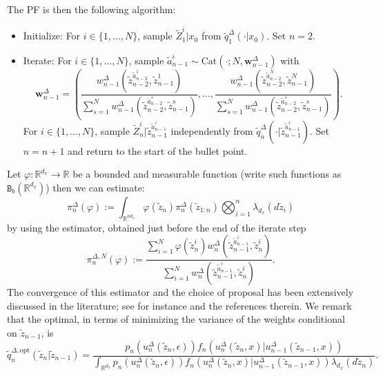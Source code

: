 \documentclass[english,13pt]{article}
\numberwithin{equation}{section}
\begin{document}
The PF is then the following algorithm:
\begin{itemize}
\item{Initialize: For $i\in\{1,\dots,N\}$,  sample $\widetilde{Z}_1^i|x_0$ from $\widetilde{q}_1^{\Delta}(\cdot|x_0)$. Set $n=2$.}
\item{Iterate: For $i\in\{1,\dots,N\}$,  sample $\widetilde{a}_{n-1}^i\sim\text{Cat}(\cdot;N,\mathbf{w}^{\Delta}_{n-1})$ with 
$$\mathbf{w}^{\Delta}_{n-1}=\left( \frac{w_{n-1}^{\Delta}(\widetilde{z}_{n-2}^{\widetilde{a}_{n-2}^1},\widetilde{z}_{n-1}^{1})}
{\sum_{s=1}^N w_{n-1}^{\Delta}(\widetilde{z}_{n-2}^{\widetilde{a}_{n-2}^s},\widetilde{z}_{n-1}^s)},\ldots,\frac{w_{n-1}^{\Delta}(\widetilde{z}_{n-2}^{\widetilde{a}_{n-2}^N},\widetilde{z}_{n-1}^{N})}
{\sum_{s=1}^N w_{n-1}^{\Delta}(\widetilde{z}_{n-2}^{\widetilde{a}_{n-2}^s},\widetilde{z}_{n-1}^s)} \right).$$
For $i\in\{1,\dots,N\}$,  sample $\widetilde{Z}_n^i|\widetilde{z}_{n-1}^{\widetilde{a}_{n-1}^i}$ independently from $\widetilde{q}_n^{\Delta}(\cdot|\widetilde{z}_{n-1}^{\widetilde{a}_{n-1}^i})$.
Set $n=n+1$ and return to the start of the bullet point.}
\end{itemize}
Let $\varphi:\mathbb{R}^{d_x}\rightarrow\mathbb{R}$ be a bounded and measurable function (write such functions as $\mathtt{B}_b(\mathbb{R}^{d_x})$) then we can estimate:
$$
\pi_n^{\Delta}(\varphi) := \int_{\mathbb{R}^{nd_x}}\varphi(\widetilde{z}_n) \pi_n^{\Delta}(\widetilde{z}_{1:n})
\bigotimes_{i=1}^n \lambda_{d_x}(d\widetilde{z}_i)
$$
by using the estimator, obtained just before the end of the iterate step
$$
\pi_n^{\Delta,N}(\varphi) := \frac{\sum_{i=1}^N \varphi(\widetilde{z}_n^i)
w_{n}^{\Delta}(\widetilde{z}_{n-1}^{\widetilde{a}_{n-1}^i},\widetilde{z}_{n}^{i})}
{\sum_{i=1}^N
w_{n}^{\Delta}(\widetilde{z}_{n-1}^{\widetilde{a}_{n-1}^i},\widetilde{z}_{n}^{i})}.
$$
The convergence of this estimator and the choice of proposal has been extensively discussed in the literature; see for instance \cite{bain,delmoral} and the references therein.  We remark that the optimal,  in terms of minimizing the variance of the weights conditional on $\widetilde{z}_{n-1}$, is
$$
\widetilde{q}_n^{\Delta,\text{opt}}(\widetilde{z}_n|\widetilde{z}_{n-1}) = 
\frac{p_n(u_n^{\Delta}(\widetilde{z}_n,\epsilon))
f_n(u_n^{\Delta}(\widetilde{z}_n,x)|u_{n-1}^{\Delta}(\widetilde{z}_{n-1},x))}
{\int_{\mathbb{R}^{d_x}}
p_n(u_n^{\Delta}(\widetilde{z}_n,\epsilon))
f_n(u_n^{\Delta}(\widetilde{z}_n,x)|u_{n-1}^{\Delta}(\widetilde{z}_{n-1},x))\lambda_{d_x}(d\widetilde{z}_n)
}.
$$
\end{document}
